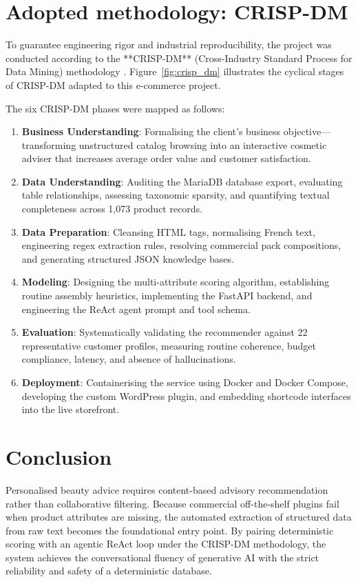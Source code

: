 \section{Adopted methodology: CRISP-DM}

To guarantee engineering rigor and industrial reproducibility, the project was conducted according to the **CRISP-DM** (Cross-Industry Standard Process for Data Mining) methodology \cite{wirth2000crisp}. Figure~\ref{fig:crisp_dm} illustrates the cyclical stages of CRISP-DM adapted to this e-commerce project.


The six CRISP-DM phases were mapped as follows:
\begin{enumerate}
  \item \textbf{Business Understanding}: Formalising the client's business objective---transforming unstructured catalog browsing into an interactive cosmetic adviser that increases average order value and customer satisfaction.
  \item \textbf{Data Understanding}: Auditing the MariaDB database export, evaluating table relationships, assessing taxonomic sparsity, and quantifying textual completeness across 1{,}073 product records.
  \item \textbf{Data Preparation}: Cleansing HTML tags, normalising French text, engineering regex extraction rules, resolving commercial pack compositions, and generating structured JSON knowledge bases.
  \item \textbf{Modeling}: Designing the multi-attribute scoring algorithm, establishing routine assembly heuristics, implementing the FastAPI backend, and engineering the ReAct agent prompt and tool schema.
  \item \textbf{Evaluation}: Systematically validating the recommender against 22 representative customer profiles, measuring routine coherence, budget compliance, latency, and absence of hallucinations.
  \item \textbf{Deployment}: Containerising the service using Docker and Docker Compose, developing the custom WordPress plugin, and embedding shortcode interfaces into the live storefront.
\end{enumerate}

\section{Conclusion}

Personalised beauty advice requires content-based advisory recommendation rather than collaborative filtering. Because commercial off-the-shelf plugins fail when product attributes are missing, the automated extraction of structured data from raw text becomes the foundational entry point. By pairing deterministic scoring with an agentic ReAct loop under the CRISP-DM methodology, the system achieves the conversational fluency of generative AI with the strict reliability and safety of a deterministic database.

\clearpage
